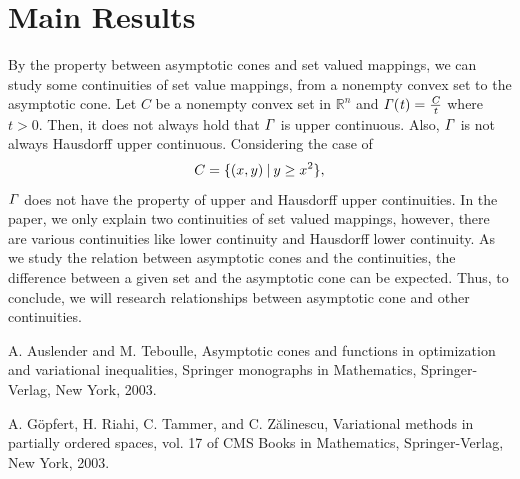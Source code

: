 \documentclass[a4paper,11pt]{jsarticle}
\theoremstyle{definition}
\newcommand{\NDemenstionalRealEuclideanSpace}{\mathbb{R}^n}
\newcommand{\SetValudMapping}{\it \Gamma}
\begin{document}
\section{\rm Main Results}

By the property between asymptotic cones and set valued mappings, we can study some continuities of set value mappings, from a nonempty convex set to the asymptotic cone. Let $C$ be a nonempty convex set in $\NDemenstionalRealEuclideanSpace$ and $\SetValudMapping (t) = \frac{C}{t}$ where $t>0$. Then, it does not always hold that $\SetValudMapping$ is upper continuous. Also, $\SetValudMapping$ is not always Hausdorff upper continuous. Considering the case of
\begin{equation}
  C = \{(x,y) \:|\: y \geq x^2\}, \notag
\end{equation}
$\SetValudMapping$ does not have the property of upper and Hausdorff upper continuities. In the paper, we only explain two continuities of set valued mappings, however, there are various continuities like lower continuity and Hausdorff lower continuity. As we study the relation between asymptotic cones and the continuities, the difference between a given set and the asymptotic cone can be expected. Thus, to conclude, we will research relationships between asymptotic cone and other continuities.

\begin{thebibliography}{9}
  A. Auslender and M. Teboulle, Asymptotic cones and functions in optimization and variational inequalities, Springer monographs in Mathematics, Springer-Verlag, New York, 2003.

  A. G\"{o}pfert, H. Riahi, C. Tammer, and C. Z\u{a}linescu, Variational methods in partially ordered spaces, vol. 17 of CMS Books in Mathematics, Springer-Verlag, New York, 2003.
  \end{thebibliography}
\end{document}
